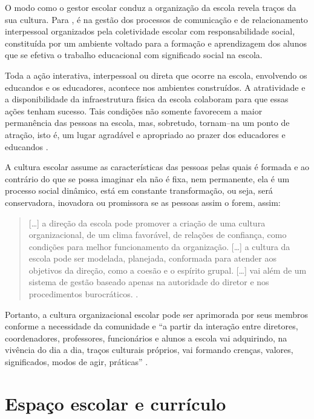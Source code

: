 \begin{refsection}
    O modo como o gestor escolar conduz a organização da escola revela traços da sua cultura. Para \textcite{LÜCK2011Gestão}, é na gestão dos processos de comunicação e de relacionamento interpessoal organizados pela coletividade escolar com responsabilidade social, constituída por um ambiente voltado para a formação e aprendizagem dos alunos que se efetiva o trabalho educacional com significado social na escola.  

    Toda a ação interativa, interpessoal ou direta que ocorre na escola, envolvendo os educandos e os educadores, acontece nos ambientes construídos. A atratividade e a disponibilidade da infraestrutura física da escola colaboram para que essas ações tenham sucesso. Tais condições não somente favorecem a maior permanência das pessoas na escola, mas, sobretudo, tornam–na um ponto de atração, isto é, um lugar agradável e apropriado ao prazer dos educadores e educandos \cite{CARPINTEROAndALMEIDA2009Teorias}. 

    A cultura escolar assume as características das pessoas pelas quais é formada e ao contrário do que se possa imaginar ela não é fixa, nem permanente, ela é um processo social dinâmico, está em constante transformação, ou seja, será conservadora, inovadora ou promissora se as pessoas assim o forem, assim: 

    \begin{quotation}
        [\dots] a direção da escola pode promover a criação de uma cultura organizacional, de um clima favorável, de relações de confiança, como condições para melhor funcionamento da organização. [\dots] a cultura da escola pode ser modelada, planejada, conformada para atender aos objetivos da direção, como a coesão e o espírito grupal. [\dots] vai além de um sistema de gestão baseado apenas na autoridade do diretor e nos procedimentos burocráticos. \cite[p.~93]{LIBÂNEO2015Organização}. 
    \end{quotation}

    Portanto, a cultura organizacional escolar pode ser aprimorada por seus membros conforme a necessidade da comunidade e “a partir da interação entre diretores, coordenadores, professores, funcionários e alunos a escola vai adquirindo, na vivência do dia a dia, traços culturais próprios, vai formando crenças, valores, significados, modos de agir, práticas” \cite[p.~94]{LIBÂNEO2015Organização}. 


    \section{Espaço escolar e currículo}


\end{refsection}
